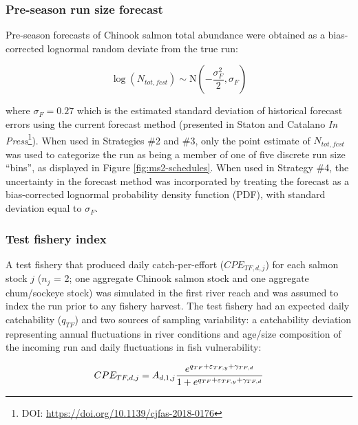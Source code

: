 \documentclass[12pt,]{book}
\let\rmarkdownfootnote\footnote%
\def\footnote{\protect\rmarkdownfootnote}
\theoremstyle{definition}
\theoremstyle{definition}
\theoremstyle{definition}
\theoremstyle{remark}
\begin{document}
\subsubsection{Pre-season run size forecast}\label{fcst}

\noindent
Pre-season forecasts of Chinook salmon total abundance were obtained as
a bias-corrected lognormal random deviate from the true run:

\begin{equation}
  \log\left(N_{tot,fcst}\right) \sim \text{N}(-\frac{\sigma_F^2}{2}, \sigma_F)
  \label{eq:get-fcst}
\end{equation}

\noindent
where \(\sigma_F = 0.27\) which is the estimated standard deviation of
historical forecast errors using the current forecast method (presented
in Staton and Catalano \emph{In Press}\footnote{DOI:
  \url{https://doi.org/10.1139/cjfas-2018-0176}}). When used in
Strategies \#2 and \#3, only the point estimate of \(N_{tot,fcst}\) was
used to categorize the run as being a member of one of five discrete run
size ``bins'', as displayed in Figure \ref{fig:ms2-schedules}. When used
in Strategy \#4, the uncertainty in the forecast method was incorporated
by treating the forecast as a bias-corrected lognormal probability
density function (PDF), with standard deviation equal to \(\sigma_F\).

\subsubsection{Test fishery index}\label{tf}

\noindent
A test fishery that produced daily catch-per-effort (\(CPE_{TF,d,j}\))
for each salmon stock \(j\) (\(n_j\) = 2; one aggregate Chinook salmon
stock and one aggregate chum/sockeye stock) was simulated in the first
river reach and was assumed to index the run prior to any fishery
harvest. The test fishery had an expected daily catchability
(\(q_{TF}\)) and two sources of sampling variability: a catchability
deviation representing annual fluctuations in river conditions and
age/size composition of the incoming run \citep{flynn-hilborn-2004} and
daily fluctuations in fish vulnerability:

\begin{equation}
  CPE_{TF,d,j} = A_{d,1,j} \space \frac{e^{q_{TF} + \varepsilon_{TF,y} + \gamma_{TF,d}}}{1+e^{q_{TF} + \varepsilon_{TF,y} + \gamma_{TF,d}}}
  \label{eq:get-tf-cpe}
\end{equation}
\end{document}
